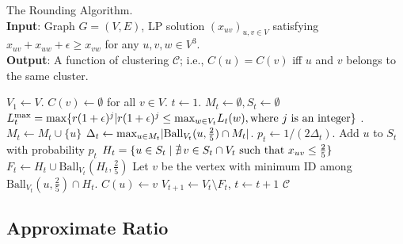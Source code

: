 \documentclass[11pt]{article}
\newcommand{\calC}{{\mathcal{C}}}
\newcommand{\ball}{\mathrm{Ball}}
\newcommand{\twofive}{\frac{2}{5}}
\begin{document}
\begin{CJK*}{UTF8}{gbsn}
\begin{algorithm}[ht!]
\caption{The Rounding Algorithm.\\
\textbf{Input}: Graph $G = (V, E)$, LP solution $( x_{uv} )_{u, v\in V}$ satisfying $x_{uv} + x_{uw} + \epsilon \geq x_{vw}$ for any $u, v, w \in V^3$.\\
\textbf{Output}: A function of clustering $\calC$; i.e., $C(u)=C(v)$ iff $u$ and $v$ belongs to the same cluster. }
\label{alg:mpcrounding}
\begin{algorithmic}[1]
    \State $V_1 \gets V$.
    \State $C(v)\gets \emptyset$ for all $v\in V$.
    \State $t\gets 1$.
        \State $M_t \gets \emptyset, S_t\gets \emptyset$
        \label{alg:mpcroundingfindcandidatestart}
        \State $L_t^{\textmd{max}} = \textmd{max}\{ r (1+\epsilon)^j | r (1+\epsilon)^j \leq \textmd{max}_{w \in V_t}{L_t(w)}, \text{where $j$ is an integer} \}$ \label{alg:randomizedPIVOTLvalue}
         
            .
            \State $M_{t} \gets M_{t} \cup \{ u \}$ 
            \EndIf
        \EndFor
        \label{alg:mpcroundingfindcandidateend}
        \State $\Delta_t \gets \textmd{max}_{u \in M_t}{|\ball_{V_t}(u, \twofive) \cap M_t|}$.\label{alg:mpcroundingfindclustercenterstart}
        \State $p_t \gets 1 / (2\Delta_t)$.
        \State Add $u$ to $S_t$ with probability $p_t$ 
        \EndFor
        \label{alg:mpcroundingfindclustercenterend}
        \State $H_t = \{u \in S_t \mid \nexists\,v \in S_t \cap V_t \textmd{ such that } x_{uv} \leq \twofive \}$ 
        \label{alg:mpcroundingaviodconflicts}
        \State $F_t \gets H_t \cup \ball_{V_t}(H_t, \twofive)$ 
            \State Let $v$ be the vertex with minimum ID among $\ball_{V_t}(u, \twofive) \cap H_t$.
            \State $C(u) \gets v$ 
        \EndFor
        \State $V_{t + 1} \gets V_t \setminus F_t$, $t\gets t+1$
    \EndWhile
    \State \Return $\calC$
    \EndFunction
\end{algorithmic}
\end{algorithm}

\subsection{Approximate Ratio}

\end{CJK*}
\end{document}
